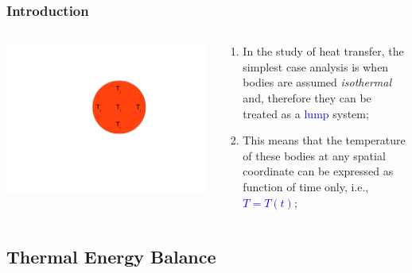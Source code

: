 \documentclass[10pt,compress]{beamer}
\newcommand{\blue}{\textcolor{blue}}
\begin{document}
\begin{frame}
 \frametitle{Introduction}
   \begin{columns}
     \begin{column}[l]{0.5\linewidth}
        \begin{center}
          \includegraphics[width=\columnwidth,clip]{./Pics/Lumped1}
        \end{center}
     \end{column}
%
     \begin{column}[l]{0.5\linewidth}
        \begin{enumerate}
           \item<1-> In the study of heat transfer, the simplest case analysis is when bodies are assumed {\it isothermal} and, therefore they can be treated as a \blue{lump} system;
           \item<1-> This means that the temperature of these bodies at any spatial coordinate can be expressed as function of time only, i.e., \blue{$T=T\left(t\right)$};
        \end{enumerate}
     \end{column}     
   \end{columns}
\end{frame}

\subsection{Thermal Energy Balance}
\end{document}
